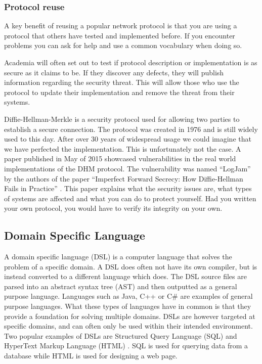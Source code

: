 \subsubsection{Protocol reuse}
A key benefit of reusing a popular network protocol is that you are using a protocol that others have tested and implemented before. If you encounter problems you can ask for help and use a common vocabulary when doing so.

Academia will often set out to test if protocol description or implementation is as secure as it claims to be. If they discover any defects, they will publish information regarding the security threat. This will allow those who use the protocol to update their implementation and remove the threat from their systems.

Diffie-Hellman-Merkle \cite{diffie1976new} is a security protocol used for allowing two parties to establish a secure connection. The protocol was created in 1976 and is still widely used to this day. After over 30 years of widespread usage we could imagine that we have perfected the implementation. This is unfortunately not the case. A paper published in May of 2015 showcased vulnerabilities in the real world implementations of the DHM protocol. The vulnerability was named ``LogJam'' by the authors of the paper ``Imperfect Forward Secrecy: How Diffie-Hellman Fails in Practice'' \cite{logjam2015}. This paper explains what the security issues are, what types of systems are affected and what you can do to protect yourself. Had you written your own protocol, you would have to verify its integrity on your own.  

\iffalse
Additionally, due
to a breakdown in communication between cryptographers
and system implementers, there is evidence that suggests
the way we are using Diffie-Hellman in today’s protocols is
insufficient to protect against state-level actors
\fi

\subsection{Domain Specific Language}
A domain specific language (DSL) \cite{fowler2010domain} is a computer language that solves the problem of a specific domain. A DSL does often not have its own compiler, but is instead converted to a different language which does. The DSL source files are parsed into an abstract syntax tree (AST) and then outputted as a general purpose language. Languages such as Java, C++ or C\# are examples of general purpose languages. What these types of languages have in common is that they provide a foundation for solving multiple domains. DSLs are however targeted at specific domains, and can often only be used within their intended environment. Two popular examples of DSLs are Structured Query Language (SQL) and HyperText Markup Language (HTML) \cite{mernik2005and}. SQL is used for querying data from a database while HTML is used for designing a web page.

